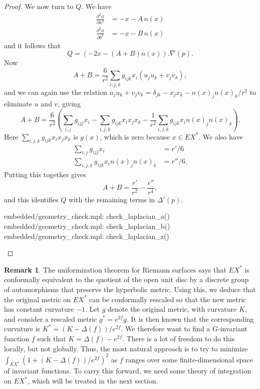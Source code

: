 \documentclass[reqno]{amsart}
\newcommand{\Dl}        {\Delta}
\newcommand{\dl}        {\delta}
\renewcommand{\:}{\colon}
\theoremstyle{definition}
\newtheorem{remark}[theorem]{Remark}
\begin{document}
\begin{proof}
 We now turn to $Q$.  We have
 \begin{align*}
  \frac{\partial^2\phi}{\partial a^2} &= - x - A\,n(x) \\
  \frac{\partial^2\phi}{\partial b^2} &= - x - B\,n(x)
 \end{align*}
 and it follows that
 \[ Q = (-2x-(A+B)n(x)) . \nabla(p). \]
 Now
 \[ A+B = \frac{6}{r^2} \sum_{i,j,k} g_{ijk}x_i(u_ju_k+v_jv_k), \]
 and we can again use the relation
 $u_ju_k+v_jv_k=\dl_{jk}-x_jx_k-n(x)_jn(x)_k/r^2$ to eliminate $u$ and
 $v$, giving
 \[ A+B = \frac{6}{r^2} \left(
     \sum_{i,j} g_{ijj}x_i -
     \sum_{i,j,k} g_{ijk}x_ix_jx_k -
     \frac{1}{r^2} \sum_{i,j,k} g_{ijk}x_in(x)_jn(x)_k
    \right).
 \]
 Here $\sum_{i,j,k} g_{ijk}x_ix_jx_k$ is $g(x)$, which is zero
 because $x\in EX^*$.  We also have
 \begin{align*}
  \sum_{i,j} g_{ijj}x_i &= r'/6 \\
  \sum_{i,j,k} g_{ijk}x_in(x)_jn(x)_k &= r''/6.
 \end{align*}
 Putting this together gives
 \[ A+B = \frac{r'}{r^2} - \frac{r''}{r^4}, \]
 and this identifies $Q$ with the remaining terms in $\Dl'(p)$.
 \begin{checks}
  embedded/geometry_check.mpl: check_laplacian_a()
  embedded/geometry_check.mpl: check_laplacian_b()
  embedded/geometry_check.mpl: check_laplacian_z()
 \end{checks}
\end{proof}

\begin{remark}
 The uniformization theorem for Riemann surfaces says that $EX^*$ is
 conformally equivalent to the quotient of the open unit disc by a
 discrete group of automorphisms that preserve the hyperbolic metric.
 Using this, we deduce that the original metric on $EX^*$ can be
 conformally rescaled so that the new metric has constant curvature
 $-1$.  Let $g$ denote the original metric, with curvature $K$, and
 consider a rescaled metric $g^*=e^{2f}g$.  It is then known that the
 corresponding curvature is $K^*=(K-\Dl(f))/e^{2f}$.  We therefore
 want to find a $G$-invariant function $f$ such that
 $K=\Dl(f)-e^{2f}$.  There is a lot of freedom to do this locally, but
 not globally.  Thus, the most natural approach is to try to minimize
 $\int_{EX^*}(1+(K-\Dl(f))/e^{2f})^2$ as $f$ ranges over some
 finite-dimensional space of invariant functions.  To carry this
 forward, we need some theory of integration on $EX^*$, which will be
 treated in the next section.
\end{remark}
\end{document}
